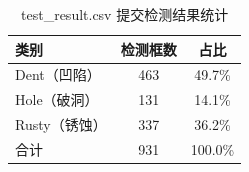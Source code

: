 \begin{table}[H]
\centering
{}
\caption{test\_result.csv 提交检测结果统计}\label{tab:submit}
\begin{tabular}{lcc}
  \toprule
  类别 & 检测框数 & 占比 \\
  \midrule
  Dent（凹陷） & 463 & 49.7\% \\
  Hole（破洞） & 131 & 14.1\% \\
  Rusty（锈蚀） & 337 & 36.2\% \\
  \midrule
  合计 & 931 & 100.0\% \\
  \bottomrule
\end{tabular}
\end{table}
